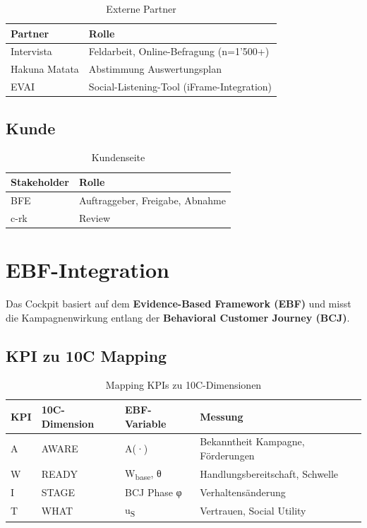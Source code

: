 \documentclass[11pt,a4paper]{article}
\begin{document}
\begin{table}[h]
\centering
{}
\begin{tabular}{L{4cm}L{8cm}}
\toprule
\textbf{Partner} & \textbf{Rolle} \\
\midrule
Intervista & Feldarbeit, Online-Befragung (n=1'500+) \\
Hakuna Matata & Abstimmung Auswertungsplan \\
EVAI & Social-Listening-Tool (iFrame-Integration) \\
\bottomrule
\end{tabular}
\caption{Externe Partner}
\end{table}

\subsection{Kunde}

\begin{table}[h]
\centering
{}
\begin{tabular}{L{4cm}L{8cm}}
\toprule
\textbf{Stakeholder} & \textbf{Rolle} \\
\midrule
BFE & Auftraggeber, Freigabe, Abnahme \\
c-rk & Review \\
\bottomrule
\end{tabular}
\caption{Kundenseite}
\end{table}

\newpage

\section{EBF-Integration}

Das Cockpit basiert auf dem \textbf{Evidence-Based Framework (EBF)} und misst die Kampagnenwirkung entlang der \textbf{Behavioral Customer Journey (BCJ)}.

\subsection{KPI zu 10C Mapping}

\begin{table}[h]
\centering
{}
\begin{tabular}{C{1.5cm}L{3cm}C{2.5cm}L{5cm}}
\toprule
\textbf{KPI} & \textbf{10C-Dimension} & \textbf{EBF-Variable} & \textbf{Messung} \\
\midrule
A & AWARE & A(·) & Bekanntheit Kampagne, Förderungen \\
W & READY & W\textsubscript{base}, θ & Handlungsbereitschaft, Schwelle \\
I & STAGE & BCJ Phase φ & Verhaltensänderung \\
T & WHAT & u\textsubscript{S} & Vertrauen, Social Utility \\
\bottomrule
\end{tabular}
\caption{Mapping KPIs zu 10C-Dimensionen}
\end{table}
\end{document}

